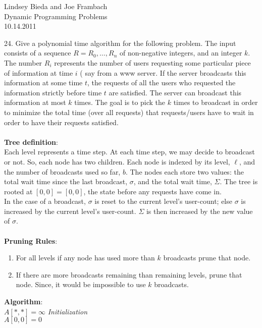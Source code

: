 \documentclass[10pt]{article}
\begin{document}
	\begin{flushright}
	Lindsey Bieda and Joe Frambach\\
	Dynamic Programming Problems\\
	10.14.2011
	\end{flushright}
	24.	Give a polynomial time algorithm for the following problem. The input consists of a sequence $R =
		R_0 , \ldots , R_n$ of non-negative integers, and an integer $k$. The number $R_i$ represents the number of
		users requesting some particular piece of information at time $i$ ( say from a www server. If the
		server broadcasts this information at some time $t$, the requests of all the users who requested the
		information strictly before time $t$ are satisfied. The server can broadcast this information at most
		$k$ times. The goal is to pick the $k$ times to broadcast in order to minimize the total time (over all
		requests) that requests/users have to wait in order to have their requests satisfied.\\
		\\
		\textbf{Tree definition}:\\
		Each level represents a time step. At each time step, we may decide to broadcast or not. So, each node has two
		children. Each node is indexed by its level, $\ell$, and the number of broadcasts used so far, $b$.
		The nodes each store two values: the total wait time since the last broadcast, $\sigma$, and the
		total wait time, $\Sigma$. The tree is rooted at $[0,0]=[0,0]$, the state before any requests have come in.\\
		In the case of a broadcast, $\sigma$ is reset to the current level's user-count; else $\sigma$
		is increased by the current level's user-count. $\Sigma$ is then increased by the new value of $\sigma$.\\
		\\
		\textbf{Pruning Rules}:
		\begin{enumerate}
			\item	For all levels if any node has used more than $k$ broadcasts prune that node. 
			\item 	If there are more broadcasts remaining than remaining levels, prune that node. Since, it would be
					impossible to use $k$ broadcasts. 
		\end{enumerate} 
		\textbf{Algorithm}:\\
		$A[*,*] = \infty$ \emph{Initialization}\\
		$A[0,0] = 0$\\
		\\
\end{document}
